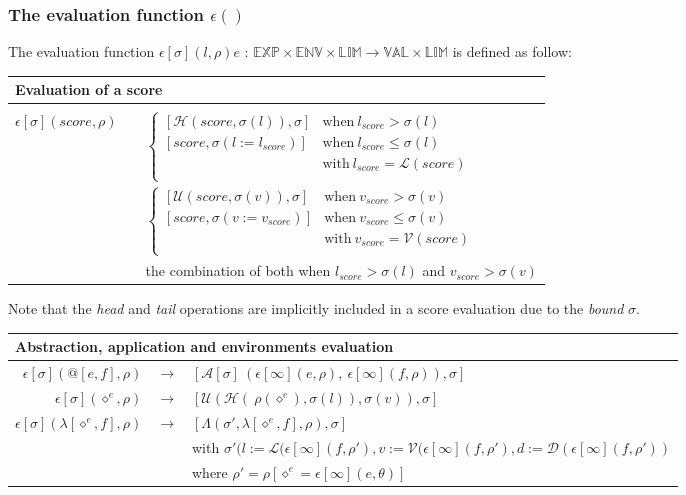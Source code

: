 \documentclass[10pt,a4paper,frenchb]{article}
\makeatletter
\newcommand{\var}[1]{\diamond^#1}
\newcommand{\expr}{\mathbb{EXP}}
\newcommand{\val}{\mathbb{VAL}}
\newcommand{\env}{\mathbb{ENV}}
\newcommand{\closure}{\Lambda}
\newcommand{\bounddomain}{\mathbb{LIM}}
\newcommand{\edomain}[3]{$#1 \times #2 \times \bounddomain \rightarrow #3 \times \bounddomain$}
\newcommand{\evalsym}{\epsilon}
\newcommand{\eval}[2][\bounds]{\evalsym[#1](#2,\rho)}
\newcommand{\evalmod}[3][\bounds]{\evalsym[#1](#2,#3)}
\newcommand{\envsym}{\rho}
\newcommand{\emptyenv}{\theta}
\newcommand{\closenv}[3][\var{e}]{\closure(#3,\lambda[#1,#2],\envsym)}
\newcommand{\apply}[1][\bounds]	{{\mathcal A}[#1]}
\newcommand{\length}		{{\mathcal L}}
\newcommand{\voices}		{{\mathcal V}}
\newcommand{\dur}			{{\mathcal D}}
\newcommand{\head}			{{\mathcal H}}
\newcommand{\tail}			{{\mathcal T}}
\renewcommand{\top}		{{\mathcal U}}
\newcommand{\bounds}		{\sigma}
\newcommand{\nobounds}	{\infty}
\newcommand{\evaltable}[1][$\rightarrow$]	  {\begin{center} \begin{tabular*}{0.9\linewidth}{rc@{ #1 }l}}
\newcommand{\evaltitle}[1]						{\multicolumn{3}{l}{#1} \\ \hline}
\newcommand{\evaltablend}  		{\end{tabular*}\end{center}}
\newcommand{\evalspace}	  		{\vspace{2mm}\\}
\makeatother
\begin{document}


\subsubsection{The evaluation function $\evalsym()$}

The evaluation function $\eval{l}{e}$ : \edomain{\expr}{\env}{\val} is defined as follow:

\evaltable
  \hline
\evaltitle {Evaluation of a score} \\
  $\eval{score}$	& & $\left\{ \begin{array}{ll}
							\left[ \head (score,\bounds(l)), \bounds \right] & \mathrm{when} \  l_{score} > \bounds(l) \\
							\left[ score, \bounds(l := l_{score}) \right] & \mathrm{when} \  l_{score} \leq \bounds(l) \\
 										& \mathrm{with} \   l_{score} = \length (score) \\
	 							\end{array} \right.$ 
 \evalspace
				& & $\left\{ \begin{array}{ll}
							\left[ \top (score,\bounds(v)), \bounds \right] & \mathrm{when} \  v_{score} > \bounds(v) \\
							\left[ score, \bounds(v:= v_{score}) \right] & \mathrm{when} \  v_{score} \leq \bounds(v) \\
 										& \mathrm{with} \   v_{score} = \voices (score) \\
	 							\end{array} \right.$ 
\evalspace
				& & the combination of both when $l_{score} > \bounds(l)$ and $v_{score} > \bounds(v)$ 
 \evaltablend

Note that the \emph{head} and \emph{tail} operations are implicitly included in a score evaluation due to the \emph{bound} $\bounds$.

\evaltable[]
\hline
\evaltitle {Abstraction, application and environments evaluation} 
  $\eval{@[e,f]}$ 			&  $\rightarrow$ & $[ \apply\ (\eval[\nobounds]{e}, \ \eval[\nobounds]{f}), \bounds]$ 
 \evalspace
 $\eval{\var{e}}$ 				& $\rightarrow$ & $[\top(\head(\ \envsym(\var{e}), \bounds(l)), \bounds(v)), \bounds]$
\evalspace
 $\eval{\lambda[\var{e},f]}$ 	& $\rightarrow$& $[ \closenv{f}{\bounds'}, \bounds]$ \\
 						& & with $\bounds'(l:=\length(\evalmod[\nobounds]{f}{\envsym'},
							v:=\voices(\evalmod[\nobounds]{f}{\envsym'},
							d:=\dur(\evalmod[\nobounds]{f}{\envsym'})$ \\
				   & & where $\envsym' = \envsym[\var{e}= \evalmod[\nobounds]{e}{\emptyenv}]$
\evaltablend
\end{document}
